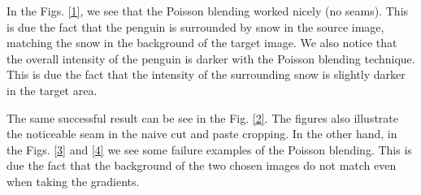 \documentclass[11pt]{article}
\begin{document}
\quad

In the Figs. \ref{1}, we see that the Poisson blending worked nicely (no seams). This is due the fact that  the penguin is surrounded by snow in the source image, matching the snow in the background of the target image. We also notice that  the overall intensity of the penguin is darker with the Poisson blending technique. This is due the fact that the intensity of the surrounding snow is slightly darker in the target area.

\quad 

The same successful result can be see in the Fig. \ref{2}. The figures also  illustrate the noticeable seam in the naive cut and paste cropping.  In the other hand, in the Figs. \ref{3} and \ref{4} we see some failure examples of the Poisson blending. This is due the fact that the background of the two chosen images do not match even when taking the gradients.

\quad
\end{document}
